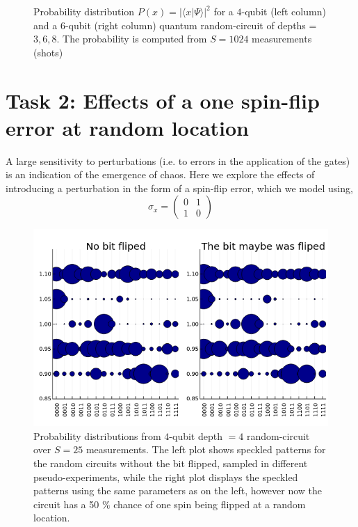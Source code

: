 \documentclass{article}
\begin{document}
\begin{figure}[p]
  \caption{Probability distribution $P(x)=|\langle x|\Psi \rangle|^2$ for a $4$-qubit (left column) and a $6$-qubit (right column) quantum random-circuit of depths =$3,6,8$. The probability is computed from $S=1024$ measurements (shots)}
  \label{fig:speckled}
\end{figure}

\section{Task 2: Effects of a one spin-flip error at random location}

A large sensitivity to perturbations (i.e. to errors in the application of the gates) is an indication of the emergence of chaos. Here we explore the effects of introducing a perturbation in the form of a spin-flip error, which we model using,
\begin{equation}
\sigma_x=
\begin{pmatrix}
0 & 1 \\
1&0
\end{pmatrix}
\end{equation}

\begin{figure}
    \centering
    \includegraphics[width=.4\textwidth]{spin_flip.png}
    \caption{Probability distributions from $4$-qubit depth $=4$ random-circuit over  $S=25$ measurements. The left plot shows speckled patterns for the random circuits  without the bit flipped, sampled in different pseudo-experiments, while the right plot displays the speckled patterns using the same parameters as on the left, however now the circuit has a 50 $\%$ chance of one spin being flipped at a random location. }
    \label{fig:spackled_pattern}
\end{figure}

\end{document}

